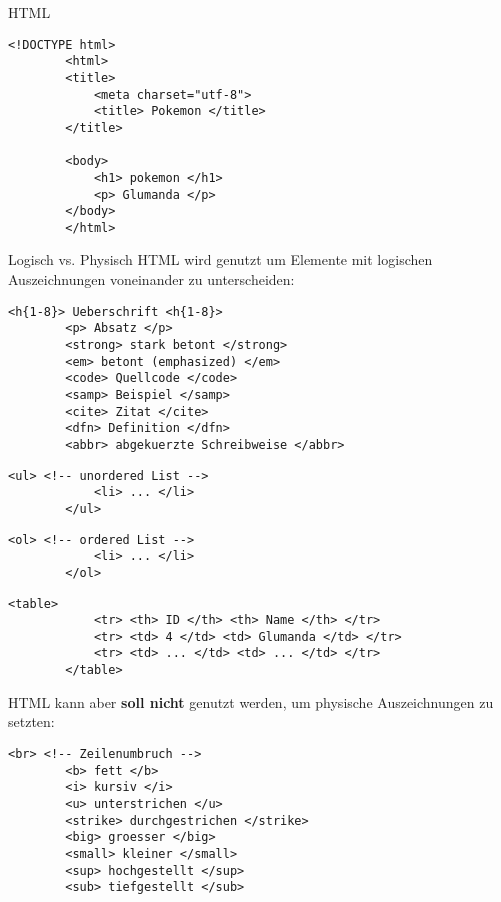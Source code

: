 \begin{example}{HTML}
    \begin{lstlisting}[language=HTML5]
        <!DOCTYPE html>
        <html>
        <title>
            <meta charset="utf-8">
            <title> Pokemon </title>
        </title>

        <body>
            <h1> pokemon </h1>
            <p> Glumanda </p>
        </body>
        </html>
    \end{lstlisting}
\end{example}

\begin{bonus}{Logisch vs. Physisch}
    HTML wird genutzt um Elemente mit logischen Auszeichnungen voneinander zu unterscheiden:

    \begin{lstlisting}[language=HTML5]
        <h{1-8}> Ueberschrift <h{1-8}>
        <p> Absatz </p>
        <strong> stark betont </strong>
        <em> betont (emphasized) </em>
        <code> Quellcode </code>
        <samp> Beispiel </samp>
        <cite> Zitat </cite>
        <dfn> Definition </dfn>
        <abbr> abgekuerzte Schreibweise </abbr>
    \end{lstlisting}

    \begin{lstlisting}[language=HTML5]
        <ul> <!-- unordered List -->
            <li> ... </li>
        </ul>
    \end{lstlisting}

    \begin{lstlisting}[language=HTML5]
        <ol> <!-- ordered List -->
            <li> ... </li>
        </ol>
    \end{lstlisting}

    \begin{lstlisting}[language=HTML5]
        <table>
            <tr> <th> ID </th> <th> Name </th> </tr>
            <tr> <td> 4 </td> <td> Glumanda </td> </tr>
            <tr> <td> ... </td> <td> ... </td> </tr>
        </table>
    \end{lstlisting}

    HTML kann aber \textbf{soll nicht} genutzt werden, um physische Auszeichnungen zu setzten:

    \begin{lstlisting}[language=HTML5]
        <br> <!-- Zeilenumbruch -->
        <b> fett </b>
        <i> kursiv </i>
        <u> unterstrichen </u>
        <strike> durchgestrichen </strike>
        <big> groesser </big>
        <small> kleiner </small>
        <sup> hochgestellt </sup>
        <sub> tiefgestellt </sub>
    \end{lstlisting}
\end{bonus}

